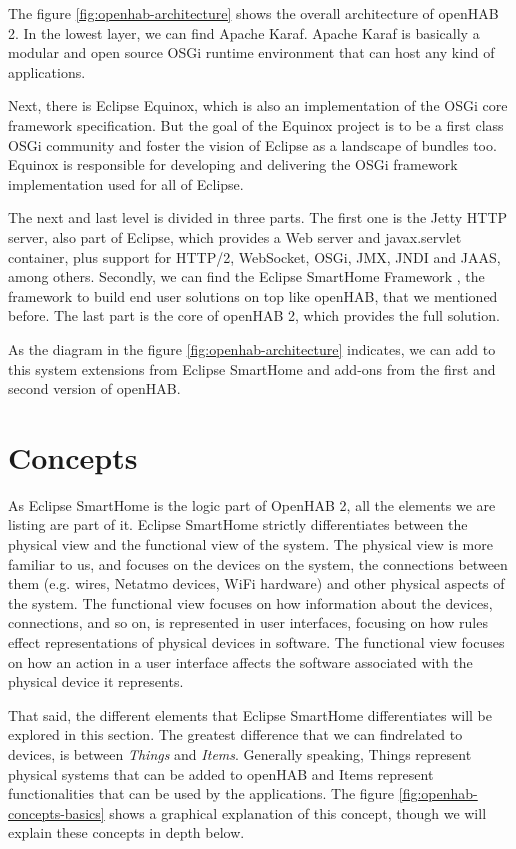 The figure \ref{fig:openhab-architecture} shows the overall architecture of openHAB 2. In the lowest layer, we can find Apache Karaf.
Apache Karaf is basically a modular and open source OSGi runtime environment that can host any kind of applications.\cite{apacheKaraf}

Next, there is Eclipse Equinox, which is also an implementation of the OSGi core framework specification. But the goal of the Equinox
project is to be a first class OSGi community and foster the vision of Eclipse as a landscape of bundles too. Equinox is responsible for
developing and delivering the OSGi framework implementation used for all of Eclipse.\cite{eclipseEquinox}

The next and last level is divided in three parts. The first one is the Jetty HTTP server, also part of Eclipse, which provides a Web server
and javax.servlet container, plus support for HTTP/2, WebSocket, OSGi, JMX, JNDI and JAAS, among others.\cite{eclipseJetty} Secondly,
we can find the Eclipse SmartHome Framework , the framework to build end user solutions on top like openHAB, that we mentioned
before.\cite{eclipseSmartHomeDocs} The last part is the core of openHAB 2, which provides the full solution.

As the diagram in the figure \ref{fig:openhab-architecture} indicates, we can add to this system extensions from Eclipse SmartHome and
add-ons from the first and second version of openHAB.

\bigskip
\section{Concepts}
As Eclipse SmartHome is the logic part of OpenHAB 2, all the elements we are listing are part of it. Eclipse SmartHome strictly differentiates
between the physical view and the functional view of the system. The physical view is more familiar to us, and focuses on the devices
on the system, the connections between them (e.g. wires, Netatmo devices, WiFi hardware) and other physical aspects of the system.
The functional view focuses on how information about the devices, connections, and so on, is represented in user interfaces, focusing
on how rules effect representations of physical devices in software. The functional view focuses on how an action in a user interface
affects the software associated with the physical device it represents.\cite{openHABDocs}

That said, the different elements that Eclipse SmartHome differentiates will be explored in this section. The greatest difference
that we can findrelated to devices, is between \textit{Things} and \textit{Items}. Generally speaking, Things represent physical
systems that can be added to openHAB and Items represent functionalities that can be used by the applications. The figure
\ref{fig:openhab-concepts-basics} shows a graphical explanation of this concept, though we will explain these concepts in depth below.

